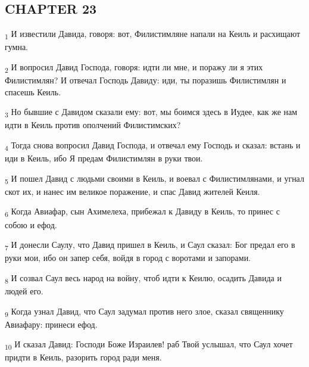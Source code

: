 \subsection{CHAPTER 23}
\begin{tcolorbox}
\textsubscript{1} И известили Давида, говоря: вот, Филистимляне напали на Кеиль и расхищают гумна.
\end{tcolorbox}
\begin{tcolorbox}
\textsubscript{2} И вопросил Давид Господа, говоря: идти ли мне, и поражу ли я этих Филистимлян? И отвечал Господь Давиду: иди, ты поразишь Филистимлян и спасешь Кеиль.
\end{tcolorbox}
\begin{tcolorbox}
\textsubscript{3} Но бывшие с Давидом сказали ему: вот, мы боимся здесь в Иудее, как же нам идти в Кеиль против ополчений Филистимских?
\end{tcolorbox}
\begin{tcolorbox}
\textsubscript{4} Тогда снова вопросил Давид Господа, и отвечал ему Господь и сказал: встань и иди в Кеиль, ибо Я предам Филистимлян в руки твои.
\end{tcolorbox}
\begin{tcolorbox}
\textsubscript{5} И пошел Давид с людьми своими в Кеиль, и воевал с Филистимлянами, и угнал скот их, и нанес им великое поражение, и спас Давид жителей Кеиля.
\end{tcolorbox}
\begin{tcolorbox}
\textsubscript{6} Когда Авиафар, сын Ахимелеха, прибежал к Давиду в Кеиль, то принес с собою и ефод.
\end{tcolorbox}
\begin{tcolorbox}
\textsubscript{7} И донесли Саулу, что Давид пришел в Кеиль, и Саул сказал: Бог предал его в руки мои, ибо он запер себя, войдя в город с воротами и запорами.
\end{tcolorbox}
\begin{tcolorbox}
\textsubscript{8} И созвал Саул весь народ на войну, чтоб идти к Кеилю, осадить Давида и людей его.
\end{tcolorbox}
\begin{tcolorbox}
\textsubscript{9} Когда узнал Давид, что Саул задумал против него злое, сказал священнику Авиафару: принеси ефод.
\end{tcolorbox}
\begin{tcolorbox}
\textsubscript{10} И сказал Давид: Господи Боже Израилев! раб Твой услышал, что Саул хочет придти в Кеиль, разорить город ради меня.
\end{tcolorbox}
